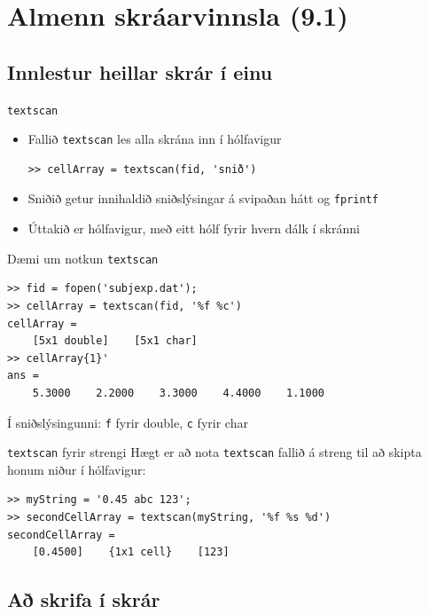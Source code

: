 \documentclass{beamer}
\begin{document}
\section{Almenn skráarvinnsla (9.1)}

\subsection{Innlestur heillar skrár í einu}

\begin{frame}[fragile]{\texttt{textscan}}
\begin{itemize}
 \item Fallið \texttt{textscan} les alla skrána inn í hólfavigur
\begin{verbatim}
>> cellArray = textscan(fid, 'snið')
\end{verbatim}
 \item Sniðið getur innihaldið sniðslýsingar á svipaðan hátt og \texttt{fprintf}
 \item Úttakið er hólfavigur, með eitt hólf fyrir hvern dálk í skránni
\end{itemize}
\end{frame}

\begin{frame}[fragile]{Dæmi um notkun \texttt{textscan}}
\begin{verbatim}
>> fid = fopen('subjexp.dat');
>> cellArray = textscan(fid, '%f %c')
cellArray = 
    [5x1 double]    [5x1 char]
>> cellArray{1}'
ans =
    5.3000    2.2000    3.3000    4.4000    1.1000
\end{verbatim}
Í sniðslýsingunni: \texttt{f} fyrir double, \texttt{c} fyrir char
\end{frame}

\begin{frame}[fragile]{\texttt{textscan} fyrir strengi}
Hægt er að nota \texttt{textscan} fallið á streng til að skipta honum niður í hólfavigur:
\begin{verbatim}
>> myString = '0.45 abc 123';
>> secondCellArray = textscan(myString, '%f %s %d')
secondCellArray = 
    [0.4500]    {1x1 cell}    [123]
\end{verbatim}
\end{frame}

\subsection{Að skrifa í skrár}
\end{document}
